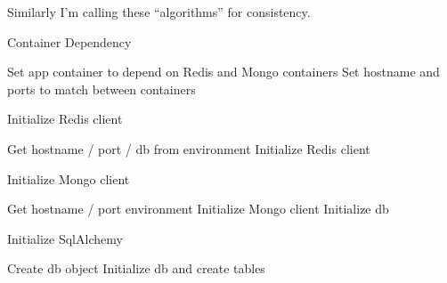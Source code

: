 Similarly I'm calling these ``algorithms'' for consistency.

\begin{algorithm}
\caption{Container Dependency}
    \begin{algorithmic}
        \STATE Set app container to depend on Redis and Mongo containers
        \STATE Set hostname and ports to match between containers
    \end{algorithmic}
\end{algorithm}

\begin{algorithm}
\caption{Initialize Redis client}
    \begin{algorithmic}
        \STATE Get hostname / port / db from environment
        \STATE Initialize Redis client
    \end{algorithmic}
\end{algorithm}

\begin{algorithm}
\caption{Initialize Mongo client}
    \begin{algorithmic}
        \STATE Get hostname / port environment
        \STATE Initialize Mongo client
        \STATE Initialize db
    \end{algorithmic}
\end{algorithm}

\begin{algorithm}
\caption{Initialize SqlAlchemy}
    \begin{algorithmic}
        \STATE Create db object
        \STATE Initialize db and create tables
    \end{algorithmic}
\end{algorithm}
